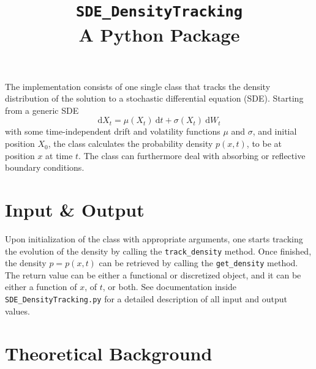 \documentclass[11pt]{article}
\title{\texttt{SDE\_DensityTracking} \\ A Python Package}
\author{}
\date{}
\newcommand{\dd}{\mathrm{d}} %
\begin{document}
\maketitle

The implementation consists of one single class that tracks the density distribution of the solution to a stochastic differential equation (SDE). 
Starting from a generic SDE
\begin{equation}
	\dd X_t = \mu(X_t)~ \dd t + \sigma(X_t) ~\dd W_t
	\label{eq:SDE_generic}
\end{equation}
with some time-independent drift and volatility functions $\mu$ and $\sigma$, and initial position $X_0$, 
the class calculates the probability density $p(x,t)$, to be at position $x$ at time $t$. 
The class can furthermore deal with absorbing or reflective boundary conditions. 


\section{Input \& Output} 

Upon initialization of the class with appropriate arguments, 
one starts tracking the evolution of the density by calling the \texttt{track\_density} method. 
Once finished, the density $p = p(x,t)$ can be retrieved by calling the \texttt{get\_density} method. 
The return value can be either a functional or discretized object, and it can be either a function of $x$, of $t$, or both. 
See documentation inside \texttt{SDE\_DensityTracking.py} for a detailed description of all input and output values. 


\section{Theoretical Background} 
\end{document}
